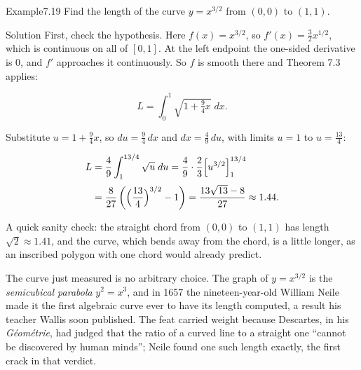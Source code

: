 \documentclass[a4paper,12pt,oneside]{memoir}
\begin{document}
\begin{workedexample}
\begin{envexample}{Example}{7.19}{}
Find the length of the curve \(y = x^{3/2}\) from \((0, 0)\) to \((1, 1)\).
\end{envexample}
\begin{envsolution}{Solution}{}{}
First, check the hypothesis. Here \(f(x) = x^{3/2}\), so \(f'(x) = \tfrac{3}{2}x^{1/2}\), which is continuous on all of \([0, 1]\). At the left endpoint the one-sided derivative is \(0\), and \(f'\) approaches it continuously. So \(f\) is smooth there and Theorem 7.3 applies:

\[ L = \int_{0}^{1} \sqrt{1 + \tfrac{9}{4}x}\;dx. \]

Substitute \(u = 1 + \tfrac{9}{4}x\), so \(du = \tfrac{9}{4}\,dx\) and \(dx = \tfrac{4}{9}\,du\), with limits \(u = 1\) to \(u = \tfrac{13}{4}\):

\[ \begin{aligned}
          L &= \frac{4}{9}\int_{1}^{13/4} \sqrt{u}\;du = \frac{4}{9}\cdot\frac{2}{3}\Bigl[u^{3/2}\Bigr]_{1}^{13/4} \\[2pt]
            &= \frac{8}{27}\left(\Bigl(\frac{13}{4}\Bigr)^{3/2} - 1\right) = \frac{13\sqrt{13} - 8}{27} \approx 1.44.
        \end{aligned} \]

A quick sanity check: the straight chord from \((0,0)\) to \((1,1)\) has length \(\sqrt{2} \approx 1.41\), and the curve, which bends away from the chord, is a little longer, as an inscribed polygon with one chord would already predict. \qedmark
\end{envsolution}
\end{workedexample}
The curve just measured is no arbitrary choice. The graph of \(y = x^{3/2}\) is the \emph{semicubical parabola} \(y^{2} = x^{3}\), and in 1657 the nineteen-year-old William Neile made it the first algebraic curve ever to have its length computed, a result his teacher Wallis soon published. The feat carried weight because Descartes, in his \emph{Géométrie}, had judged that the ratio of a curved line to a straight one “cannot be discovered by human minds”; Neile found one such length exactly, the first crack in that verdict.
\end{document}
